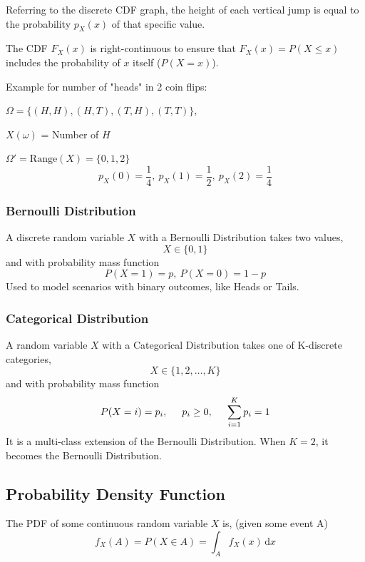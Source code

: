 \documentclass[../Probability.tex]{subfiles}
\begin{document}
\noindent Referring to the discrete CDF graph, the height of each vertical
jump is equal to the probability $p_X(x)$ of that specific value.

\smallskip

\noindent The CDF $F_X(x)$ is right-continuous to ensure that 
$F_X(x) = P(X \leq x)$ includes the probability of $x$ itself 
($P(X=x)$).

\medskip

\noindent Example for number of "heads" in 2 coin flips:

$\Omega = \{(H,H), (H,T), (T,H), (T,T)\}$, 

$X(\omega)$ = Number of $H$

$\Omega' = \text{Range}(X) = \{0,1,2\}$
\[p_X(0) = \frac{1}{4},\:p_X(1) = \frac{1}{2}, \:p_X(2) = \frac{1}{4}\]


\subsubsection{Bernoulli Distribution}
A discrete random variable $X$ with a Bernoulli Distribution takes two values,
\[X\in \{0,1\}\]
and with probability mass function
\[P(X=1) = p,\:P(X=0)=1-p\]
\noindent Used to model scenarios with binary outcomes, like Heads or Tails.

\subsubsection{Categorical Distribution}
A random variable $X$ with a Categorical Distribution takes one of K-discrete categories,
\[X\in \{1,2,\ldots,K\}\]
and with probability mass function
\[P(X=i) = p_i,\hspace{0.5cm}p_i\geq 0,\hspace{0.5cm} \sum_{i=1}^K p_i=1\]
\noindent It is a multi-class extension of the Bernoulli Distribution. When $K=2$,
it becomes the Bernoulli Distribution.

\subsection{Probability Density Function}
The PDF of some continuous random variable $X$ is, (given some event A)
\[f_X(A) = P(X\in A) = \int_A f_X(x)\,\mathrm{d}x\]
\end{document}
